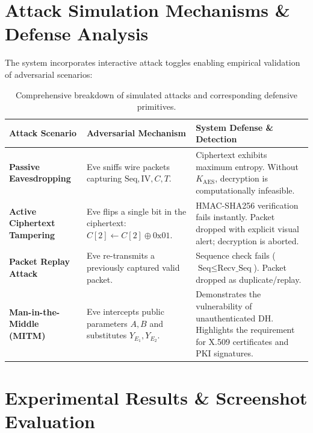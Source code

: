 \documentclass[11pt,a4paper]{article}
\begin{document}
\section{Attack Simulation Mechanisms \& Defense Analysis}

The system incorporates interactive attack toggles enabling empirical validation of adversarial scenarios:

\begin{table}[H]
\centering
\small
\renewcommand{\arraystretch}{1.3}
\begin{tabularx}{\linewidth}{l >{\raggedright\arraybackslash}X >{\raggedright\arraybackslash}X}
\toprule
\textbf{Attack Scenario} & \textbf{Adversarial Mechanism} & \textbf{System Defense \& Detection} \\
\midrule
\textbf{Passive Eavesdropping} & Eve sniffs wire packets capturing $\text{Seq}, \text{IV}, C, T$. & Ciphertext exhibits maximum entropy. Without $K_{\text{AES}}$, decryption is computationally infeasible. \\
\addlinespace
\textbf{Active Ciphertext Tampering} & Eve flips a single bit in the ciphertext: $C[2] \leftarrow C[2] \oplus \text{0x01}$. & HMAC-SHA256 verification fails instantly. Packet dropped with explicit visual alert; decryption is aborted. \\
\addlinespace
\textbf{Packet Replay Attack} & Eve re-transmits a previously captured valid packet. & Sequence check fails ($\text{Seq} \le \text{Recv\_Seq}$). Packet dropped as duplicate/replay. \\
\addlinespace
\textbf{Man-in-the-Middle (MITM)} & Eve intercepts public parameters $A, B$ and substitutes $Y_{E_1}, Y_{E_2}$. & Demonstrates the vulnerability of unauthenticated DH. Highlights the requirement for X.509 certificates and PKI signatures. \\
\bottomrule
\end{tabularx}
\caption{Comprehensive breakdown of simulated attacks and corresponding defensive primitives.}
\label{tab:attack_matrix}
\end{table}

\section{Experimental Results \& Screenshot Evaluation}
\end{document}
